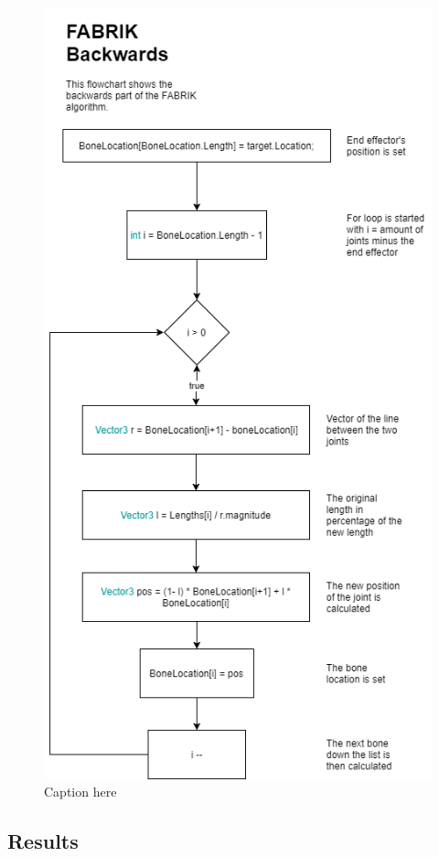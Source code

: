 \begin{figure}[H]
\centering
\includegraphics[width=1\textwidth]{FABRIK/Flowchart.png}
\caption{Caption here}
\label{fig:flow}
\end{figure}

\subsection{Results}

